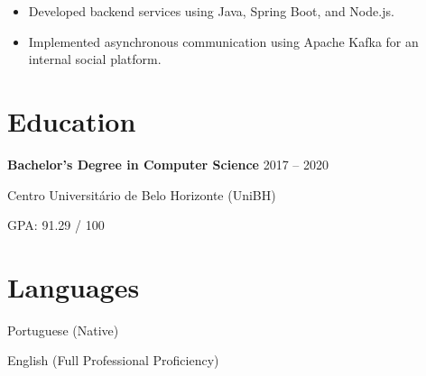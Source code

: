 \documentclass[10pt,a4paper]{article}
\begin{document}


\begin{itemize}
    \item Developed backend services using Java, Spring Boot, and Node.js.
    \item Implemented asynchronous communication using Apache Kafka for an internal social platform.
\end{itemize}


\section{Education}

\textbf{Bachelor's Degree in Computer Science}
\hfill
2017 -- 2020

Centro Universitário de Belo Horizonte (UniBH)

GPA: 91.29 / 100


\section{Languages}

Portuguese (Native)

English (Full Professional Proficiency)
\end{document}
